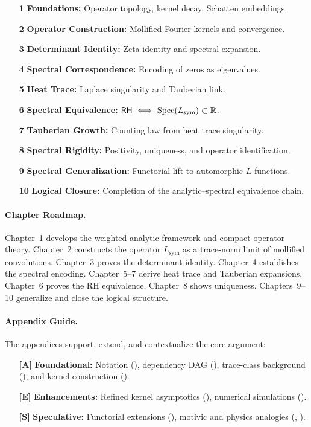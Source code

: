 \begin{itemize}
  \item[\textbf{1}] \textbf{Foundations:} Operator topology, kernel decay, Schatten embeddings.
  \item[\textbf{2}] \textbf{Operator Construction:} Mollified Fourier kernels and convergence.
  \item[\textbf{3}] \textbf{Determinant Identity:} Zeta identity and spectral expansion.
  \item[\textbf{4}] \textbf{Spectral Correspondence:} Encoding of zeros as eigenvalues.
  \item[\textbf{5}] \textbf{Heat Trace:} Laplace singularity and Tauberian link.
  \item[\textbf{6}] \textbf{Spectral Equivalence:} \( \mathsf{RH} \iff \operatorname{Spec}(L_{\mathrm{sym}}) \subset \mathbb{R} \).
  \item[\textbf{7}] \textbf{Tauberian Growth:} Counting law from heat trace singularity.
  \item[\textbf{8}] \textbf{Spectral Rigidity:} Positivity, uniqueness, and operator identification.
  \item[\textbf{9}] \textbf{Spectral Generalization:} Functorial lift to automorphic \( L \)-functions.
  \item[\textbf{10}] \textbf{Logical Closure:} Completion of the analytic–spectral equivalence chain.
\end{itemize}

\paragraph*{Chapter Roadmap.}
Chapter~1 develops the weighted analytic framework and compact operator theory. Chapter~2 constructs the operator \( L_{\mathrm{sym}} \) as a trace-norm limit of mollified convolutions. Chapter~3 proves the determinant identity. Chapter~4 establishes the spectral encoding. Chapter~5–7 derive heat trace and Tauberian expansions. Chapter~6 proves the RH equivalence. Chapter~8 shows uniqueness. Chapters~9–10 generalize and close the logical structure.

\paragraph*{Appendix Guide.}
The appendices support, extend, and contextualize the core argument:

\begin{itemize}
  \item[\textbf{[A]}] \textbf{Foundational:} Notation (), dependency DAG (), trace-class background (), and kernel construction ().
  \item[\textbf{[E]}] \textbf{Enhancements:} Refined kernel asymptotics (), numerical simulations ().
  \item[\textbf{[S]}] \textbf{Speculative:} Functorial extensions (), motivic and physics analogies (, ).
\end{itemize}


